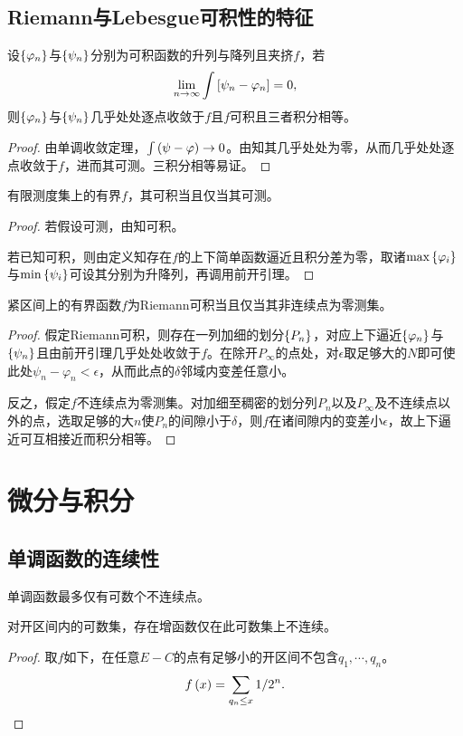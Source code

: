 \documentclass{ctexrep}
\begin{document}
  \subsection{Riemann与Lebesgue可积性的特征}
  \begin{lemma}
    设$\left\{\varphi_n\right\}$与$\left\{\psi_n\right\}$分别为可积函数的升列与降列且夹挤$f$，若
    \[ \lim_{n\to\infty}\int\left[\psi_n-\varphi_n\right]=0, \]
    则$\left\{\varphi_n\right\}$与$\left\{\psi_n\right\}$几乎处处逐点收敛于$f$且$f$可积且三者积分相等。
  \end{lemma}
  \begin{proof}
    由单调收敛定理，$\int\left(\psi-\varphi\right)\to 0$。由知其几乎处处为零，从而几乎处处逐点收敛于$f$，进而其可测。三积分相等易证。
  \end{proof}
  \begin{theorem}
    有限测度集上的有界$f$，其可积当且仅当其可测。
  \end{theorem}
  \begin{proof}
    若假设可测，由知可积。
    \par
    若已知可积，则由定义知存在$f$的上下简单函数逼近且积分差为零，取诸$\text{max}\left\{\varphi_i\right\}$与$\text{min}\left\{\psi_i\right\}$可设其分别为升降列，再调用前开引理。
  \end{proof}
  \begin{theorem}[Lebesgue]
    紧区间上的有界函数$f$为Riemann可积当且仅当其非连续点为零测集。
  \end{theorem}
  \begin{proof}
    假定Riemann可积，则存在一列加细的划分$\left\{P_n\right\}$，对应上下逼近$\left\{\varphi_n\right\}$与$\left\{\psi_n\right\}$且由前开引理几乎处处收敛于$f$。在除开$P_\infty$的点处，对$\epsilon$取足够大的$N$即可使此处$\psi_n-\varphi_n<\epsilon$，从而此点的$\delta$邻域内变差任意小。
    \par
    反之，假定$f$不连续点为零测集。对加细至稠密的划分列$P_n$以及$P_\infty$及不连续点以外的点，选取足够的大$n$使$P_n$的间隙小于$\delta$，则$f$在诸间隙内的变差小$\epsilon$，故上下逼近可互相接近而积分相等。
  \end{proof}
  \section{微分与积分}
  \subsection{单调函数的连续性}
  \begin{theorem}
    单调函数最多仅有可数个不连续点。
  \end{theorem}
  \begin{proposition}
    对开区间内的可数集，存在增函数仅在此可数集上不连续。
  \end{proposition}
  \begin{proof}
    取$f$如下，在任意$E-C$的点有足够小的开区间不包含$q_1,\cdots ,q_n$。
    \[ f\left(x\right) = \sum_{q_n\le x} 1/2^n. \qedhere \]
  \end{proof}
\end{document}
